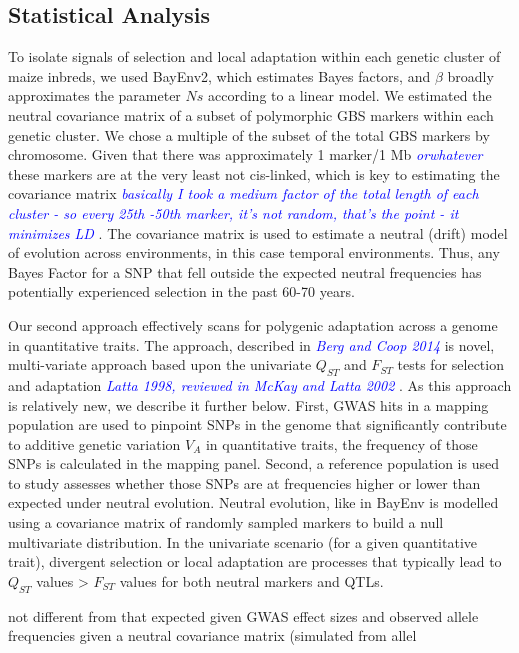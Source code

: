 \documentclass[9pt,twocolumn,twoside]{gsajnl}
\newcommand{\kc}[1]{\textcolor{blue}{ \emph{ #1}} }
\begin{document}
\subsection*{Statistical Analysis} 
To isolate signals of selection and local adaptation within each genetic cluster of maize inbreds,  we used BayEnv2, which estimates Bayes factors, and $\beta$ broadly approximates the parameter $Ns$ according to a linear model. 
We estimated the neutral covariance matrix of a subset of polymorphic GBS markers within each genetic cluster. We chose a multiple of the subset of the total GBS markers by chromosome. Given that there was approximately 1 marker/1 Mb \kc{orwhatever} these markers are at the very least not cis-linked, which is key to estimating the covariance matrix \kc{basically I took a medium factor of the total length of each cluster - so every 25th -50th marker, it's not random, that's the point - it minimizes LD}. 
The covariance matrix is used to estimate a neutral (drift) model of evolution across environments, in this case temporal environments. 
Thus, any Bayes Factor for a SNP that fell outside the expected neutral frequencies has potentially experienced selection in the past 60-70 years.

Our second approach effectively scans for polygenic adaptation across a genome in quantitative traits. The approach, described in \kc{Berg and Coop 2014} is novel, multi-variate approach based upon the univariate $Q_{ST}$ and $F_{ST}$ tests for selection and adaptation \kc{Latta 1998, reviewed in McKay and Latta 2002}. 
As this approach is relatively new, we describe it further below.
First, GWAS hits in a mapping population are used to pinpoint SNPs in the genome that significantly contribute to additive genetic variation $V_A$ in quantitative traits, the frequency of those SNPs is calculated in the mapping panel. Second, a reference population is used to study assesses whether those SNPs are at frequencies higher or lower than expected under neutral evolution. Neutral evolution, like in BayEnv is modelled using a covariance matrix of randomly sampled markers to build a null multivariate distribution.
In the univariate scenario (for a given quantitative trait), divergent selection or local adaptation are processes that typically lead to $Q_{ST}$ values > $F_{ST}$ values for both neutral markers and QTLs.

not different from that expected given GWAS effect sizes and observed allele frequencies given a neutral covariance matrix (simulated from allel
\end{document}

